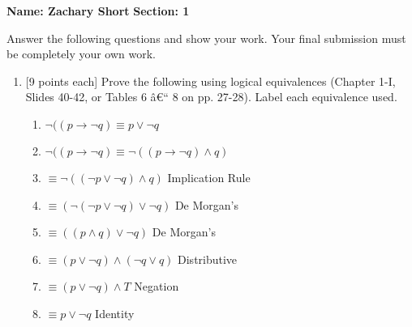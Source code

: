 \documentclass[11pt]{article}
\begin{document}
{\bf Name: Zachary Short}
\hspace{10.75cm}
{\bf Section: 1}

\vskip 0.5cm
Answer the following questions and show your work.  Your final submission must be completely your own work.
\begin{enumerate}
\item {[9 points each]}  Prove the following using logical equivalences (Chapter 1-I, Slides 40-42, or Tables 6 â€“ 8 on pp. 27-28).  
Label each equivalence used. 

\begin{enumerate}[label=\alph*., itemsep=0mm] 
\item $\neg ((p \rightarrow \neg q) \equiv p \vee \neg q$ 
\item  $\neg ((p \rightarrow \neg q)\equiv \neg ((p \rightarrow \neg q) \wedge q)$ 
\item \hspace{2cm} $\equiv \neg ((\neg p \vee \neg q) \wedge q)$ Implication Rule
\item \hspace{2cm} $\equiv (\neg(\neg p \vee \neg q) \vee \neg q)$  De Morgan's
\item \hspace{2cm} $\equiv ((p \wedge q) \vee \neg q)$ De Morgan's
\item \hspace{2cm} $\equiv (p \vee \neg q)  \wedge (\neg q \vee q)$ Distributive
\item \hspace{2cm} $\equiv (p \vee \neg q)  \wedge T$ Negation
\item \hspace{2cm} $\equiv p \vee \neg q$ Identity


\end{enumerate}
\end{enumerate}
\end{document}
